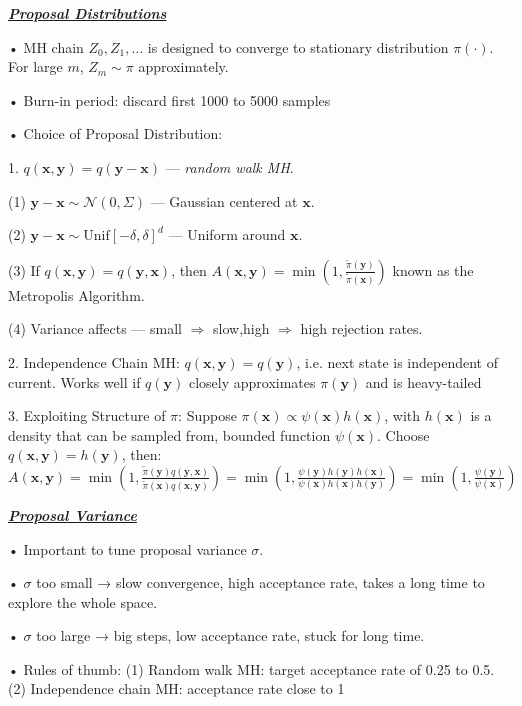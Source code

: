 \documentclass[10pt]{article}
\newcommand{\bulletPoint}[1]{\ul{\textit{\textbf{#1}}}}
\begin{document}
\begin{multicols*}{3}
\bulletPoint{Proposal Distributions}\quad

• MH chain $Z_0, Z_1, \dots$ is designed to converge to stationary distribution $\pi(\cdot)$.   
For large $m$, $Z_m \sim \pi$ approximately.   

• Burn-in period: discard first 1000 to 5000 samples

• Choice of Proposal Distribution:

1. $q(\mathbf{x}, \mathbf{y}) = q(\mathbf{y} - \mathbf{x})$ — \textit{random walk MH}.   

(1) $\mathbf{y} - \mathbf{x} \sim \mathcal{N}(0, \Sigma)$ — Gaussian centered at $\mathbf{x}$. \quad  

(2) $\mathbf{y} - \mathbf{x} \sim \text{Unif}[-\delta, \delta]^d$ — Uniform around $\mathbf{x}$.   \quad

(3) If $q(\mathbf{x}, \mathbf{y}) = q(\mathbf{y}, \mathbf{x})$, then  
$A(\mathbf{x}, \mathbf{y}) = \min\left(1, \frac{\tilde{\pi}(\mathbf{y})}{\tilde{\pi}(\mathbf{x})}\right)$  known as the Metropolis Algorithm. 

(4) Variance affects — small $\Rightarrow$ slow,\quad high $\Rightarrow$ high rejection rates.

2. Independence Chain MH: 
$q(\mathbf{x}, \mathbf{y}) = q(\mathbf{y})$, i.e. next state is independent of current. \quad  
Works well if $q(\mathbf{y})$ closely approximates $\pi(\mathbf{y})$ and is heavy-tailed

3. Exploiting Structure of $\pi$: 
Suppose $\pi(\mathbf{x}) \propto \psi(\mathbf{x}) h(\mathbf{x})$, with $h(\mathbf{x})$ is a density
that can be sampled from, bounded function $\psi(\mathbf{x})$. \quad  
Choose $q(\mathbf{x}, \mathbf{y}) = h(\mathbf{y})$, then:
$A(\mathbf{x}, \mathbf{y}) = \min\left(1, \frac{\tilde{\pi}(\mathbf{y})q(\mathbf{y}, \mathbf{x})}{\tilde{\pi}(\mathbf{x})q(\mathbf{x}, \mathbf{y})} \right)
= \min\left(1, \frac{\psi(\mathbf{y})h(\mathbf{y})h(\mathbf{x})}{\psi(\mathbf{x})h(\mathbf{x})h(\mathbf{y})} \right)
= \min\left(1, \frac{\psi(\mathbf{y})}{\psi(\mathbf{x})} \right)$


\bulletPoint{Proposal Variance} \quad

• Important to tune proposal variance $\sigma$. \quad

• $\sigma$ too small → slow convergence, high acceptance rate, takes a long time to explore the whole space. 

• $\sigma$ too large → big steps, low acceptance rate, stuck for long time. 

• Rules of thumb:
(1) Random walk MH: target acceptance rate of 0.25 to 0.5. 
(2) Independence chain MH: acceptance rate close to 1


\end{multicols*}
\end{document}
